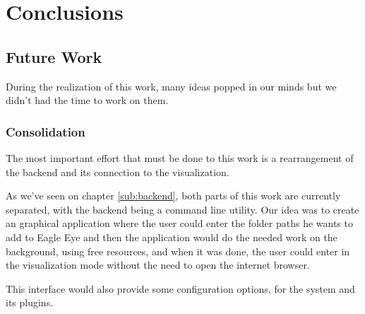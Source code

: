 
\chapter{Conclusions}
\label{chapter:conclusions}




\section{Future Work} %
\label{future_work}

During the realization of this work, many ideas popped in our minds but we didn't had the time to work on them.

\subsection{Consolidation} %
\label{sec:consolidation}

The most important effort that must be done to this work is a rearrangement of the backend and its connection to the visualization.

As we've seen on chapter \ref{sub:backend}, both parts of this work are currently separated, with the backend being a command line utility. Our idea was to create an graphical application where the user could enter the folder paths he wants to add to Eagle Eye and then the application would do the needed work on the background, using free resources, and when it was done, the user could enter in the visualization mode without the need to open the internet browser.

This interface would also provide some configuration options, for the system and its plugins.



